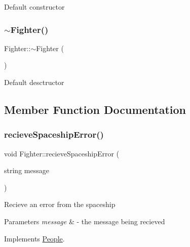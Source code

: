 Default constructor \mbox{\label{classFighter_a7c7f2ffa4724887e564af51a6154b703}} 
\subsubsection{\texorpdfstring{$\sim$\+Fighter()}{~Fighter()}}
{\footnotesize\ttfamily Fighter\+::$\sim$\+Fighter (\begin{DoxyParamCaption}{ }\end{DoxyParamCaption})\hspace{0.3cm}{\ttfamily [inline]}}

Default desctructor 

\subsection{Member Function Documentation}
\mbox{\label{classFighter_aecd2761c68aed8499e210fd0ca11c447}} 
\subsubsection{\texorpdfstring{recieve\+Spaceship\+Error()}{recieveSpaceshipError()}}
{\footnotesize\ttfamily void Fighter\+::recieve\+Spaceship\+Error (\begin{DoxyParamCaption}\item[{string}]{message }\end{DoxyParamCaption})\hspace{0.3cm}{\ttfamily [virtual]}}

Recieve an error from the spaceship 
\begin{DoxyParams}{Parameters}
{\em message} & -\/ the message being recieved \\
\hline
\end{DoxyParams}


Implements \hyperlink{classPeople_a0685df78be631783138865e03cc7c85d}{People}.

\mbox{\label{classFighter_a42b60e52427e5c69daf141351655805c}} 
